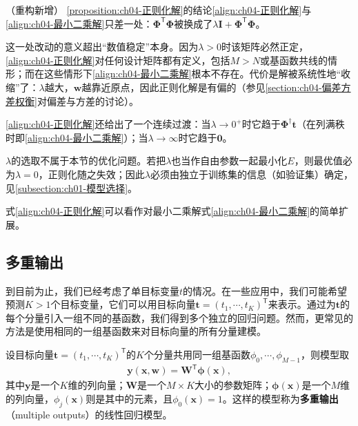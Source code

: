 \documentclass[../../main.tex]{subfiles}
\begin{document}
\begin{remark}（重构新增）
\cref{proposition:ch04-正则化解}的结论\eqref{align:ch04-正则化解}与\eqref{align:ch04-最小二乘解}只差一处：$\boldsymbol{\Phi}^{\mathsf{T}}\boldsymbol{\Phi}$被换成了$\lambda\boldsymbol{I}+\boldsymbol{\Phi}^{\mathsf{T}}\boldsymbol{\Phi}$。

这一处改动的意义超出“数值稳定”本身。因为$\lambda>0$时该矩阵必然正定，\eqref{align:ch04-正则化解}对任何设计矩阵都有定义，包括$M>N$或基函数共线的情形；而在这些情形下\eqref{align:ch04-最小二乘解}根本不存在。代价是解被系统性地“收缩”了：$\lambda$越大，$\boldsymbol{w}$越靠近原点，因此正则化解是有偏的（参见\cref{section:ch04-偏差方差权衡}对偏差与方差的讨论）。

\eqref{align:ch04-正则化解}还给出了一个连续过渡：当$\lambda\to0^{+}$时它趋于$\boldsymbol{\Phi}^{\dagger}\boldsymbol{t}$（在列满秩时即\eqref{align:ch04-最小二乘解}）；当$\lambda\to\infty$时它趋于$\boldsymbol{0}$。

$\lambda$的选取不属于本节的优化问题。若把$\lambda$也当作自由参数一起最小化$E$，则最优值必为$\lambda=0$，正则化随之失效；因此$\lambda$必须由独立于训练集的信息（如验证集）确定，见\cref{subsection:ch01-模型选择}。
\end{remark}

式\eqref{align:ch04-正则化解}可以看作对最小二乘解式\eqref{align:ch04-最小二乘解}的简单扩展。

\subsection{多重输出}\label{subsection:ch04-多重输出}

到目前为止，我们已经考虑了单目标变量$t$的情况。在一些应用中，我们可能希望预测$K>1$个目标变量，它们可以用目标向量$\boldsymbol{t}=(t_1,\cdots,t_K)^{\mathsf{T}}$来表示。通过为$\boldsymbol{t}$的每个分量引入一组不同的基函数，我们得到多个独立的回归问题。然而，更常见的方法是使用相同的一组基函数来对目标向量的所有分量建模。

\begin{definition}[多重输出回归]\label{definition:ch04-多重输出}
设目标向量$\boldsymbol{t}=(t_1,\cdots,t_K)^{\mathsf{T}}$的$K$个分量共用同一组基函数$\phi_0,\cdots,\phi_{M-1}$，则模型取
\begin{align}
  \boldsymbol{y}(\boldsymbol{x},\boldsymbol{w})=\boldsymbol{W}^{\mathsf{T}}\boldsymbol{\phi}(\boldsymbol{x}),
  \label{align:ch04-多重输出}
\end{align}
其中$\boldsymbol{y}$是一个$K$维的列向量；$\boldsymbol{W}$是一个$M\times K$大小的参数矩阵；$\boldsymbol{\phi}(\boldsymbol{x})$是一个$M$维的列向量，$\phi_j(\boldsymbol{x})$则是其中的元素，且$\phi_0(\boldsymbol{x})=1$。这样的模型称为\textbf{多重输出}（multiple outputs）的线性回归模型。
\end{definition}
\end{document}
